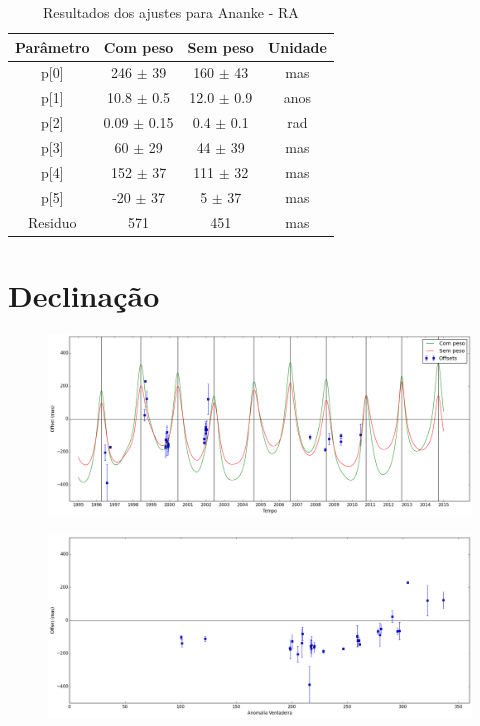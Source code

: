 \documentclass[11pt,a4paper]{report}
\begin{document}
\begin{table}[h!]
\caption{\label{Tab: Ananke-RA} Resultados dos ajustes para Ananke - RA}
\begin{centering}
\begin{tabular}{cccc}
\hline
\hline
Parâmetro & Com peso & Sem peso & Unidade\tabularnewline
\hline
p[0] & 246 $\pm$ 39 & 160 $\pm$ 43 & mas\\
p[1] & 10.8 $\pm$ 0.5 & 12.0 $\pm$ 0.9 & anos\\
p[2] & 0.09 $\pm$ 0.15 & 0.4 $\pm$ 0.1 & rad\\
p[3] & 60 $\pm$ 29 & 44 $\pm$ 39 & mas\\
p[4] & 152 $\pm$ 37 & 111 $\pm$ 32 & mas\\
p[5] & -20 $\pm$ 37 & 5 $\pm$ 37 & mas\\
Residuo & 571 & 451 & mas\\
\hline 
\end{tabular} 
\par\end{centering}
\end{table}

\section*{Declinação}


\begin{figure}[h]
\includegraphics[scale=0.35]{Ananke/DEC.png} 
\end{figure}

\begin{figure}[h]
\includegraphics[scale=0.35]{Ananke/DEC_anom.png}  
\end{figure}
\end{document}
